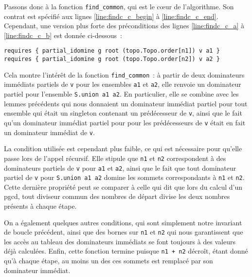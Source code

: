 \documentclass[a4paper,10pt]{article}
\begin{document}
Passons donc à la fonction \lstinline{find_common}, qui est le cœur de l'algorithme. Son contrat est spécifié aux lignes \ref{line:findc_c_begin} à \ref{line:findc_c_end}. Cependant, une version plus forte des préconditions des lignes \ref{line:findc_c_a} à \ref{line:findc_c_b} est donnée ci-dessous~:
\begin{lstlisting}
requires { partial_idomine g root (topo.Topo.order[n1]) v a1 }
requires { partial_idomine g root (topo.Topo.order[n2]) v a2 }
\end{lstlisting}

Cela montre l'intérêt de la fonction \lstinline{find_common}~: à partir de deux dominateurs immédiats partiels de \lstinline{v} pour les ensembles \lstinline{a1} et \lstinline{a2}, elle renvoie un dominateur partiel pour l'ensemble \lstinline{S.union a1 a2}. En particulier, elle se combine avec les lemmes précédents qui nous donnaient un dominateur immédiat partiel pour tout ensemble qui était un singleton contenant un prédécesseur de \lstinline{v}, ainsi que le fait qu'un dominateur immédiat partiel pour pour les prédécesseurs de \lstinline{v} était en fait un dominateur immédiat de \lstinline{v}.

La condition utilisée est cependant plus faible, ce qui est nécessaire pour qu'elle passe lors de l'appel récursif. Elle stipule que \lstinline{n1} et \lstinline{n2} correspondent à des dominateurs partiels de \lstinline{v} pour \lstinline{a1} et \lstinline{a2}, ainsi que le fait que tout dominateur partiel de \lstinline{v} pour \lstinline{S.union a1 a2} domine les sommets correspondants à \lstinline{n1} et \lstinline{n2}. Cette dernière propriété peut se comparer à celle qui dit que lors du calcul d'un pgcd, tout diviseur commun des nombres de départ divise les deux nombres présents à chaque étape.

On a également quelques autres conditions, qui sont simplement notre invariant de boucle précédent, ainsi que des bornes sur \lstinline{n1} et \lstinline{n2} qui nous garantissent que les accès au tableau des dominateurs immédiats se font toujours à des valeurs déjà calculées. Enfin, cette fonction termine puisque \lstinline{n1 + n2} décroît, étant donné qu'à chaque étape, au moins un des ces sommets est remplacé par son dominateur immédiat.
\end{document}
